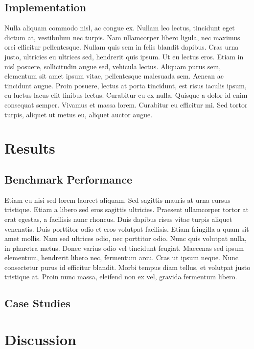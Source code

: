 \documentclass[11pt,a4paper]{article}
\begin{document}
\subsection{Implementation}

Nulla aliquam commodo nisl, ac congue ex. Nullam leo lectus, tincidunt eget dictum at, vestibulum nec turpis. Nam ullamcorper libero ligula, nec maximus orci efficitur pellentesque. Nullam quis sem in felis blandit dapibus. Cras urna justo, ultricies eu ultrices sed, hendrerit quis ipsum. Ut eu lectus eros. Etiam in nisl posuere, sollicitudin augue sed, vehicula lectus. Aliquam purus sem, elementum sit amet ipsum vitae, pellentesque malesuada sem. Aenean ac tincidunt augue. Proin posuere, lectus at porta tincidunt, est risus iaculis ipsum, eu luctus lacus elit finibus lectus. Curabitur eu ex nulla. Quisque a dolor id enim consequat semper. Vivamus et massa lorem. Curabitur eu efficitur mi. Sed tortor turpis, aliquet ut metus eu, aliquet auctor augue.


\section{Results}

\subsection{Benchmark Performance}

 Etiam eu nisi sed lorem laoreet aliquam. Sed sagittis mauris at urna cursus tristique. Etiam a libero sed eros sagittis ultricies. Praesent ullamcorper tortor at erat egestas, a facilisis nunc rhoncus. Duis dapibus risus vitae turpis aliquet venenatis. Duis porttitor odio et eros volutpat facilisis. Etiam fringilla a quam sit amet mollis. Nam sed ultrices odio, nec porttitor odio. Nunc quis volutpat nulla, in pharetra metus. Donec varius odio vel tincidunt feugiat. Maecenas sed ipsum elementum, hendrerit libero nec, fermentum arcu. Cras ut ipsum neque. Nunc consectetur purus id efficitur blandit. Morbi tempus diam tellus, et volutpat justo tristique at. Proin nunc massa, eleifend non ex vel, gravida fermentum libero.

\subsection{Case Studies}


\section{Discussion}
\end{document}
